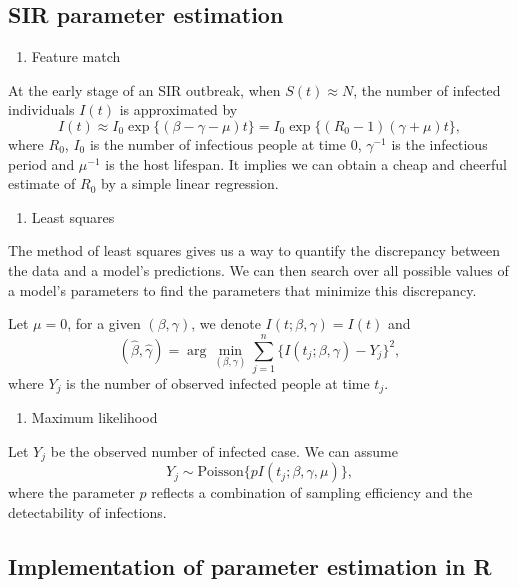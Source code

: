 \documentclass[]{book}
\providecommand{\tightlist}{%
  \setlength{\itemsep}{0pt}\setlength{\parskip}{0pt}}
\begin{document}
\subsection{SIR parameter estimation}\label{sir-parameter-estimation}

\begin{enumerate}
\def\labelenumi{\arabic{enumi}.}
\tightlist
\item
  Feature match
\end{enumerate}

At the early stage of an SIR outbreak, when \(S(t) \approx N\), the
number of infected individuals \(I(t)\) is approximated by \[
I(t) \approx I_0 \exp \{(\beta - \gamma - \mu) t\} = I_0 \exp \{(R_0 - 1)(\gamma + \mu)t\},
\] where \(R_0\), \(I_0\) is the number of infectious people at time
\(0\), \(\gamma^{-1}\) is the infectious period and \(\mu^{-1}\) is the
host lifespan. It implies we can obtain a cheap and cheerful estimate of
\(R_0\) by a simple linear regression.

\begin{enumerate}
\def\labelenumi{\arabic{enumi}.}
\setcounter{enumi}{1}
\tightlist
\item
  Least squares
\end{enumerate}

The method of least squares gives us a way to quantify the discrepancy
between the data and a model's predictions. We can then search over all
possible values of a model's parameters to find the parameters that
minimize this discrepancy.

Let \(\mu = 0\), for a given \((\beta, \gamma)\), we denote
\(I(t;\beta, \gamma) = I(t)\) and \[
  (\widehat{\beta}, \widehat{\gamma}) = \arg\min_{(\beta, \gamma)}\sum_{j = 1}^{n} \{I(t_j;\beta, \gamma) - Y_j\}^2, 
\] where \(Y_j\) is the number of observed infected people at time
\(t_j\).

\begin{enumerate}
\def\labelenumi{\arabic{enumi}.}
\setcounter{enumi}{2}
\tightlist
\item
  Maximum likelihood
\end{enumerate}

Let \(Y_j\) be the observed number of infected case. We can assume \[
  Y_j \sim \textrm{Poisson}\{pI(t_j;\beta, \gamma, \mu)\}, 
\] where the parameter \(p\) reflects a combination of sampling
efficiency and the detectability of infections.

\subsection{Implementation of parameter estimation in
R}\label{implementation-of-parameter-estimation-in-r}
\end{document}

